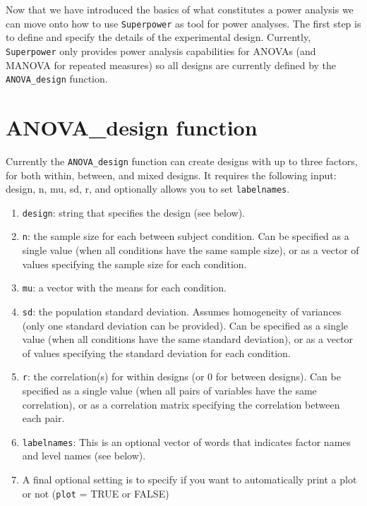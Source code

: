 \documentclass[
]{book}
\providecommand{\tightlist}{%
  \setlength{\itemsep}{0pt}\setlength{\parskip}{0pt}}
\begin{document}
Now that we have introduced the basics of what constitutes a power analysis we can move onto how to use \texttt{Superpower} as tool for power analyses. The first step is to define and specify the details of the experimental design. Currently, \texttt{Superpower} only provides power analysis capabilities for ANOVAs (and MANOVA for repeated measures) so all designs are currently defined by the \texttt{ANOVA\_design} function.

\hypertarget{anova_design-function}{%
\section{ANOVA\_design function}\label{anova_design-function}}

Currently the \texttt{ANOVA\_design} function can create designs with up to three factors, for both within, between, and mixed designs. It requires the following input: design, n, mu, sd, r, and optionally allows you to set \texttt{labelnames}.

\begin{enumerate}
\def\labelenumi{\arabic{enumi}.}
\tightlist
\item
  \texttt{design}: string that specifies the design (see below).
\item
  \texttt{n}: the sample size for each between subject condition. Can be specified as a single value (when all conditions have the same sample size), or as a vector of values specifying the sample size for each condition.
\item
  \texttt{mu}: a vector with the means for each condition.
\item
  \texttt{sd}: the population standard deviation. Assumes homogeneity of variances (only one standard deviation can be provided). Can be specified as a single value (when all conditions have the same standard deviation), or as a vector of values specifying the standard deviation for each condition.
\item
  \texttt{r}: the correlation(s) for within designs (or 0 for between designs). Can be specified as a single value (when all pairs of variables have the same correlation), or as a correlation matrix specifying the correlation between each pair.
\item
  \texttt{labelnames}: This is an optional vector of words that indicates factor names and level names (see below).
\item
  A final optional setting is to specify if you want to automatically print a plot or not (\texttt{plot} = TRUE or FALSE)
\end{enumerate}
\end{document}
